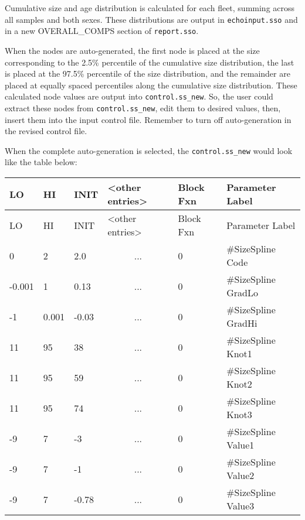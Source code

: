 Cumulative size and age distribution is calculated for each fleet, summing across all samples and both sexes. These distributions are output in \texttt{echoinput.sso} and in a new OVERALL\_COMPS section of \texttt{report.sso}.
	
When the nodes are auto-generated, the first node is placed at the size corresponding to the 2.5\% percentile of the cumulative size distribution, the last is placed at the 97.5\% percentile of the size distribution, and the remainder are placed at equally spaced percentiles along the cumulative size distribution. These calculated node values are output into \texttt{control.ss\_new}. So, the user could extract these nodes from \texttt{control.ss\_new}, edit them to desired values, then, insert them into the input control file. Remember to turn off auto-generation in the revised control file.
	
When the complete auto-generation is selected, the \texttt{control.ss\_new} would look like the table below:	

\begin{longtable}{p{1cm} p{1cm} p{1cm} p{2.9cm} p{1.9cm} p{4.2cm}}
	\hline
	LO \Tstrut & HI & INIT & <other entries> & Block Fxn & Parameter Label \Bstrut\\
	\hline
	\endfirsthead

	\hline
	LO \Tstrut & HI & INIT & <other entries> & Block Fxn & Parameter Label \Bstrut\\
	\hline
	\endhead

	0 \Tstrut &		2 &   2.0 & \multicolumn{1}{c}{...} & 0 & \#SizeSpline Code \\
	-0.001    &		1 &  0.13 & \multicolumn{1}{c}{...} & 0 & \#SizeSpline GradLo \\
	-1        & 0.001 & -0.03 & \multicolumn{1}{c}{...} & 0 & \#SizeSpline GradHi \\
	11        &	   95 & 	38 & \multicolumn{1}{c}{...} & 0 & \#SizeSpline Knot1 \\
	11        &	   95 & 	59 & \multicolumn{1}{c}{...} & 0 & \#SizeSpline Knot2 \\
	11        &	   95 & 	74 & \multicolumn{1}{c}{...} & 0 & \#SizeSpline Knot3 \\
	-9        & 	7 & 	-3 & \multicolumn{1}{c}{...} & 0 & \#SizeSpline Value1 \\
	-9        &		7 & 	-1 & \multicolumn{1}{c}{...} & 0 & \#SizeSpline Value2 \\
	-9        &		7 & -0.78 & \multicolumn{1}{c}{...} & 0 & \#SizeSpline Value3 \Bstrut\\
	\hline
\end{longtable}

